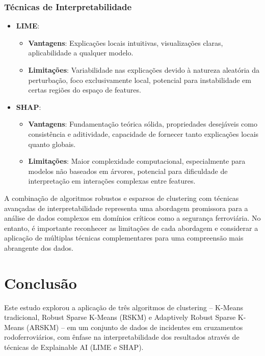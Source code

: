 \documentclass[conference]{IEEEtran}
\begin{document}
\subsubsection{Técnicas de Interpretabilidade}
\begin{itemize}
    \item \textbf{LIME}:
        \begin{itemize}
            \item \textbf{Vantagens}: Explicações locais intuitivas, visualizações claras, aplicabilidade a qualquer modelo.
            \item \textbf{Limitações}: Variabilidade nas explicações devido à natureza aleatória da perturbação, foco exclusivamente local, potencial para instabilidade em certas regiões do espaço de features.
        \end{itemize}
    
    \item \textbf{SHAP}:
        \begin{itemize}
            \item \textbf{Vantagens}: Fundamentação teórica sólida, propriedades desejáveis como consistência e aditividade, capacidade de fornecer tanto explicações locais quanto globais.
            \item \textbf{Limitações}: Maior complexidade computacional, especialmente para modelos não baseados em árvores, potencial para dificuldade de interpretação em interações complexas entre features.
        \end{itemize}
\end{itemize}

A combinação de algoritmos robustos e esparsos de clustering com técnicas avançadas de interpretabilidade representa uma abordagem promissora para a análise de dados complexos em domínios críticos como a segurança ferroviária. No entanto, é importante reconhecer as limitações de cada abordagem e considerar a aplicação de múltiplas técnicas complementares para uma compreensão mais abrangente dos dados.

\section{Conclusão}
Este estudo explorou a aplicação de três algoritmos de clustering – K-Means tradicional, Robust Sparse K-Means (RSKM) e Adaptively Robust Sparse K-Means (ARSKM) – em um conjunto de dados de incidentes em cruzamentos rodoferroviários, com ênfase na interpretabilidade dos resultados através de técnicas de Explainable AI (LIME e SHAP).
\end{document}
